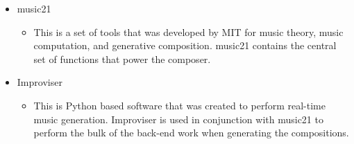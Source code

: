 \begin{itemize}
\begin{itemize}
	\end{itemize}
	\item music21
	\begin{itemize}
		\item This is a set of tools that was developed by MIT for music theory, music computation, and generative composition.  music21 contains the central set of functions that power the composer.
	\end{itemize}
	\item Improviser
	\begin{itemize}
		\item This is Python based software that was created to perform real-time music generation.  Improviser is used in conjunction with music21 to perform the bulk of the back-end work when generating the compositions.
	\end{itemize}
\end{itemize}